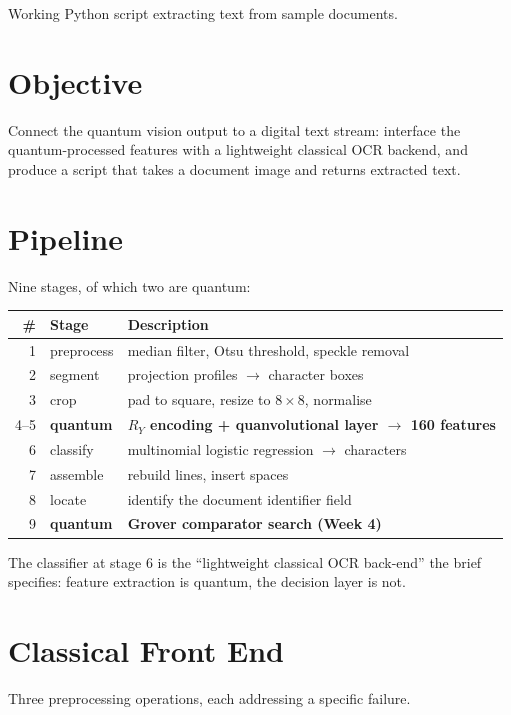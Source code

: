 \documentclass[11pt,a4paper]{article}
\begin{document}
{Working Python script extracting text from sample documents.}

\section{Objective}

Connect the quantum vision output to a digital text stream: interface the
quantum-processed features with a lightweight classical OCR backend, and produce
a script that takes a document image and returns extracted text.

\section{Pipeline}

Nine stages, of which two are quantum:

\begin{center}
\small
\begin{tabular}{@{}rll@{}}
\toprule
\# & Stage & Description \\
\midrule
1 & preprocess & median filter, Otsu threshold, speckle removal \\
2 & segment & projection profiles $\rightarrow$ character boxes \\
3 & crop & pad to square, resize to $8\times8$, normalise \\
4--5 & \textbf{quantum} & \textbf{$R_Y$ encoding + quanvolutional layer $\rightarrow$ 160 features} \\
6 & classify & multinomial logistic regression $\rightarrow$ characters \\
7 & assemble & rebuild lines, insert spaces \\
8 & locate & identify the document identifier field \\
9 & \textbf{quantum} & \textbf{Grover comparator search (Week 4)} \\
\bottomrule
\end{tabular}
\end{center}

The classifier at stage 6 is the ``lightweight classical OCR back-end'' the brief
specifies: feature extraction is quantum, the decision layer is not.

\section{Classical Front End}

Three preprocessing operations, each addressing a specific failure.
\end{document}
